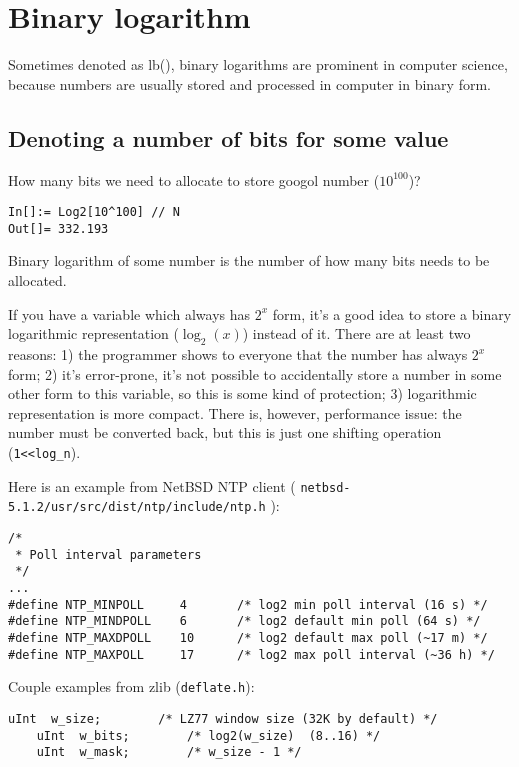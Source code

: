 \section{Binary logarithm}

Sometimes denoted as lb(), binary logarithms are prominent in computer science, 
because numbers are usually stored and processed in computer in binary form.

\subsection{Denoting a number of bits for some value}

How many bits we need to allocate to store googol number ($10^{100}$)?

\begin{lstlisting}[caption=Wolfram Mathematica]
In[]:= Log2[10^100] // N
Out[]= 332.193
\end{lstlisting}

Binary logarithm of some number is the number of how many bits needs to be allocated.

If you have a variable which always has $2^x$ form, it's a good idea to store a binary logarithmic representation ($\log_2 (x)$) instead of it.
There are at least two reasons:
1) the programmer shows to everyone that the number has always $2^x$ form;
2) it's error-prone, it's not possible to accidentally store a number in some other form to this variable, so this is some kind of protection;
3) logarithmic representation is more compact.
There is, however, performance issue: the number must be converted back, but this is just one shifting operation (\texttt{1<<log\_n}).

Here is an example from NetBSD NTP client ( \texttt{netbsd-5.1.2/usr/src/dist/ntp/include/ntp.h} ):

\begin{lstlisting}[caption=C code]
/*
 * Poll interval parameters
 */
...
#define NTP_MINPOLL     4       /* log2 min poll interval (16 s) */
#define NTP_MINDPOLL    6       /* log2 default min poll (64 s) */
#define NTP_MAXDPOLL    10      /* log2 default max poll (~17 m) */
#define NTP_MAXPOLL     17      /* log2 max poll interval (~36 h) */
\end{lstlisting}

Couple examples from zlib (\texttt{deflate.h}):

\begin{lstlisting}[caption=C code]
    uInt  w_size;        /* LZ77 window size (32K by default) */
    uInt  w_bits;        /* log2(w_size)  (8..16) */
    uInt  w_mask;        /* w_size - 1 */
\end{lstlisting}

